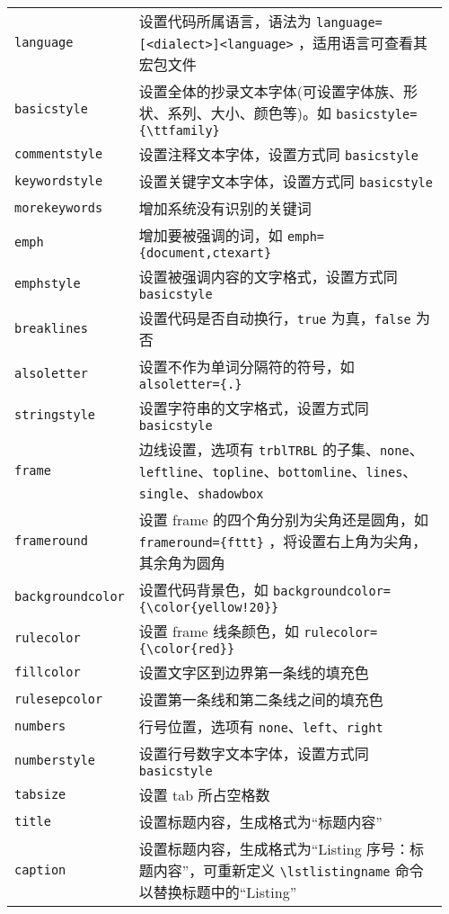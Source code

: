 \documentclass[UTF8,hyperref]{ctexart}
\renewcommand{\lstlistingname}{源程序}
\begin{document}
\begin{longtable}{@{}p{0.23\linewidth}p{0.73\linewidth}}
	\verb|language| & 设置代码所属语言，语法为 \verb|language=[<dialect>]<language>| ，适用语言可查看其宏包文件 \\
	\verb|basicstyle| & 设置全体的抄录文本字体(可设置字体族、形状、系列、大小、颜色等)。如 \verb|basicstyle={\ttfamily}| \\
	\verb|commentstyle| & 设置注释文本字体，设置方式同 \verb|basicstyle| \\
	\verb|keywordstyle| & 设置关键字文本字体，设置方式同 \verb|basicstyle| \\
	\verb|morekeywords| & 增加系统没有识别的关键词 \\
	\verb|emph| & 增加要被强调的词，如 \verb|emph={document,ctexart}| \\
	\verb|emphstyle| & 设置被强调内容的文字格式，设置方式同 \verb|basicstyle| \\
	\verb|breaklines| & 设置代码是否自动换行，\verb|true| 为真，\verb|false| 为否 \\
	\verb|alsoletter| & 设置不作为单词分隔符的符号，如 \verb|alsoletter={.}| \\
	\verb|stringstyle| & 设置字符串的文字格式，设置方式同 \verb|basicstyle| \\
	\verb|frame| & 边线设置，选项有 \verb|trblTRBL| 的子集、\verb|none|、\verb|leftline|、\verb|topline|、\verb|bottomline|、\verb|lines|、\verb|single|、\verb|shadowbox| \\
	\verb|frameround| & 设置 frame 的四个角分别为尖角还是圆角，如 \verb|frameround={fttt}| ，将设置右上角为尖角，其余角为圆角 \\
	\verb|backgroundcolor| & 设置代码背景色，如 \verb|backgroundcolor={\color{yellow!20}}| \\
	\verb|rulecolor| & 设置 frame 线条颜色，如 \verb|rulecolor={\color{red}}| \\
	\verb|fillcolor| & 设置文字区到边界第一条线的填充色 \\
	\verb|rulesepcolor| & 设置第一条线和第二条线之间的填充色 \\
	\verb|numbers| & 行号位置，选项有 \verb|none|、\verb|left|、\verb|right| \\
	\verb|numberstyle| & 设置行号数字文本字体，设置方式同 \verb|basicstyle| \\
	\verb|tabsize| & 设置 tab 所占空格数 \\
	\verb|title| & 设置标题内容，生成格式为``标题内容'' \\
	\verb|caption| & 设置标题内容，生成格式为``Listing 序号：标题内容''，可重新定义 \verb|\lstlistingname| 命令以替换标题中的``Listing'' \\

\end{longtable}
\end{document}
